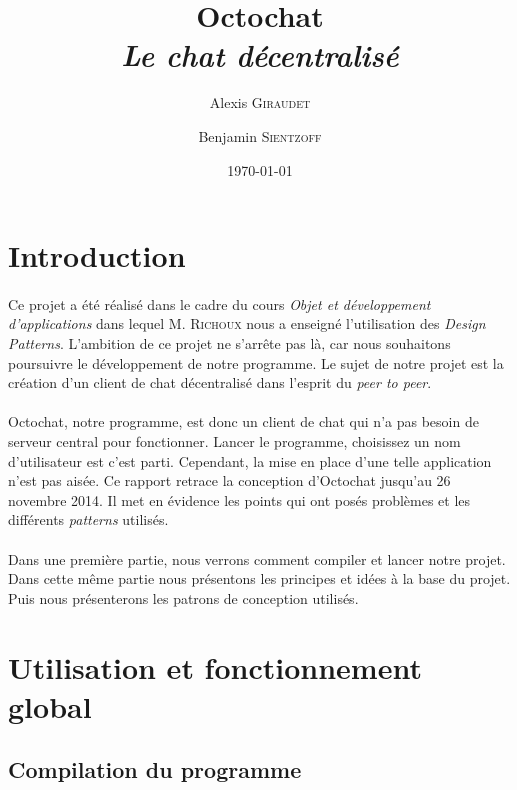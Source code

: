 \documentclass[a4paper]{article}
\title{Octochat \\ \textit{Le chat décentralisé}}
\author{Alexis \textsc{Giraudet} \and Benjamin \textsc{Sientzoff}}
\date{\today}
\begin{document}
	\maketitle
	\vspace{9cm}
	\tableofcontents
	\newpage %

	\section*{Introduction}
		\paragraph{}{
		Ce projet a été réalisé dans le cadre du cours \textit{Objet et développement d'applications}
		dans lequel M. \textsc{Richoux} nous a enseigné l'utilisation des \textit{Design Patterns}.
		L'ambition de ce projet ne s'arrête pas là, car nous souhaitons poursuivre le développement de notre
		programme. Le sujet de notre projet est la création d'un client de chat décentralisé dans l'esprit du
		\textit{peer to peer}.
		}
		\paragraph{}{
		Octochat, notre programme, est donc un client de chat qui n'a pas besoin de serveur central pour fonctionner.
		Lancer le programme, choisissez un nom d'utilisateur est c'est parti. Cependant, la mise en place d'une telle
		application n'est pas aisée. Ce rapport retrace la conception d'Octochat jusqu'au 26 novembre 2014. Il met en évidence les points qui ont posés problèmes et les différents \textit{patterns} utilisés.
		}
		\paragraph{}{
		Dans une première partie, nous verrons comment compiler et lancer notre projet. Dans cette même
		partie nous présentons les principes et idées à la base du projet. Puis nous présenterons les patrons
		de conception utilisés.
		}

	\newpage

	\section{Utilisation et fonctionnement global}

		\subsection{Compilation du programme}
\end{document}
